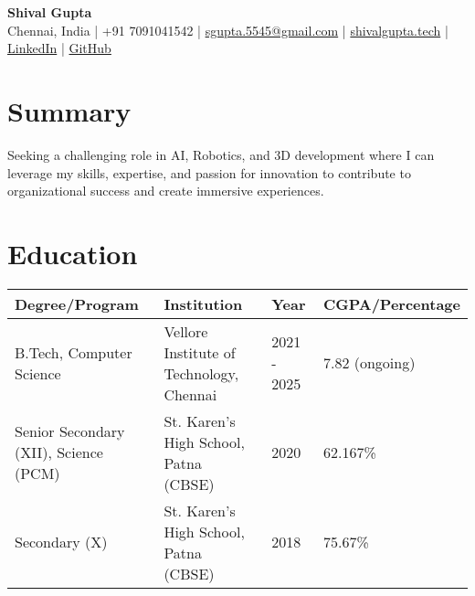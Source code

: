 \documentclass[a4paper,10pt]{article} %
\newcommand{\sectionbreak}{\vspace{0cm}} %
\begin{document}
\begin{center}
    \centering
    {\fontsize{24pt}{28pt}\selectfont \textbf{Shival Gupta}} \\
    \vspace{0.2cm}
    \small Chennai, India | +91 7091041542 | \href{mailto:sgupta.5545@gmail.com}{\textcolor{accentcolor}{sgupta.5545@gmail.com}} | \href{https://shivalgupta.tech/}{\textcolor{accentcolor}{shivalgupta.tech}} | \href{https://linkedin.com/in/shival-gupta/}{\textcolor{accentcolor}{LinkedIn}} | \href{https://github.com/shival-gupta/}{\textcolor{accentcolor}{GitHub}}
\end{center}

\sectionbreak

\hrulefill

\sectionbreak

\section{Summary}
Seeking a challenging role in AI, Robotics, and 3D development where I can leverage my skills, expertise, and passion for innovation to contribute to organizational success and create immersive experiences.

\sectionbreak

\section{Education}

\begin{tabular}{|l|l|l|l|}
\hline
\textbf{Degree/Program} & \textbf{Institution} & \textbf{Year} & \textbf{CGPA/Percentage} \\ \hline
B.Tech, Computer Science & Vellore Institute of Technology, Chennai & 2021 - 2025 & 7.82 (ongoing) \\ \hline
Senior Secondary (XII), Science (PCM) & St. Karen's High School, Patna (CBSE) & 2020 & 62.167\% \\ \hline
Secondary (X) & St. Karen's High School, Patna (CBSE) & 2018 & 75.67\% \\ \hline
\end{tabular}

\sectionbreak

\end{document}
